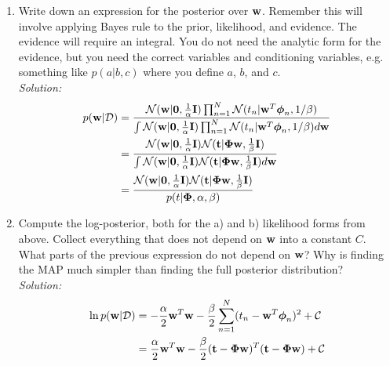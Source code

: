 \documentclass[12pt,a4paper]{article}
\newcommand{\Data}{\mathcal{D}}
\newcommand{\DataIndex}{n}
\newcommand{\eye}{{\bf I}}
\newcommand{\tscalar}{t}
\newcommand{\tvec}{{\bf \tscalar}}
\newcommand{\wscalar}{w}
\newcommand{\wvec}{{\bf \wscalar}}
\newcommand{\tn}{\tscalar_{\DataIndex}}
\newcommand{\zerovec}{ {\bf 0}}
\newcommand{\phivec}{\boldsymbol{\phi}}
\newcommand{\Phimat}{\boldsymbol{\Phi}}
\newcommand{\phivecn}{\phivec_{\DataIndex}}
\begin{document}
\begin{enumerate}
  \item Write down an expression for the posterior over $\wvec$.  Remember this will involve applying Bayes rule to the prior, likelihood, and evidence.  The evidence will require an integral.  You do not need the analytic form for the evidence, but you need the correct variables and conditioning variables, e.g. something like $p(a|b,c)$ where you define $a$, $b$, and $c$.\\
	  \emph{Solution:} \\
		  \begin{align*}
		  	p(\wvec | \Data) &= \frac{\mathcal{N}(\wvec | \zerovec, \frac{1}{\alpha} \eye) \prod_{n=1}^{N} \mathcal{N}(\tn| \wvec^T \phivecn, 1 / \beta)}{\int \mathcal{N}(\wvec | \zerovec, \frac{1}{\alpha} \eye) \prod_{n=1}^{N} \mathcal{N}(\tn| \wvec^T \phivecn, 1 / \beta) d\wvec} \\
		  	&= \frac{\mathcal{N}(\wvec | \zerovec, \frac{1}{\alpha} \eye) \mathcal{N} (\tvec | \Phimat \wvec, \frac{1}{\beta} \eye)}{\int {\mathcal{N}(\wvec | \zerovec, \frac{1}{\alpha} \eye) \mathcal{N} (\tvec | \Phimat \wvec, \frac{1}{\beta} \eye) d\wvec}} \\
		  	&= \frac{\mathcal{N}(\wvec | \zerovec, \frac{1}{\alpha} \eye) \mathcal{N} (\tvec | \Phimat \wvec, \frac{1}{\beta} \eye)}{p(t | \Phimat, \alpha, \beta)}
		  \end{align*}
  
  \item Compute the log-posterior, both for the a) and b) likelihood forms from above.  Collect everything that does not depend on $\wvec$ into a constant $C$.  What parts of the previous expression do not depend on $\wvec$?  Why is finding the MAP much simpler than finding the full posterior distribution? \\
	  \emph{Solution:} \\
		  \begin{align*}
		  \ln p(\wvec | \Data) &= - \frac{\alpha}{2} \wvec^T \wvec - \frac{\beta}{2} \sum_{n=1}^{N}(\tn - \wvec^T \phivecn)^{2} + \mathcal{C} \\
		  &= \frac{\alpha}{2} \wvec^T \wvec - \frac{\beta}{2} (\tvec - \Phimat \wvec)^{T} (\tvec - \Phimat \wvec) + \mathcal{C}
		  \end{align*}
  

\end{enumerate}
\end{document}
